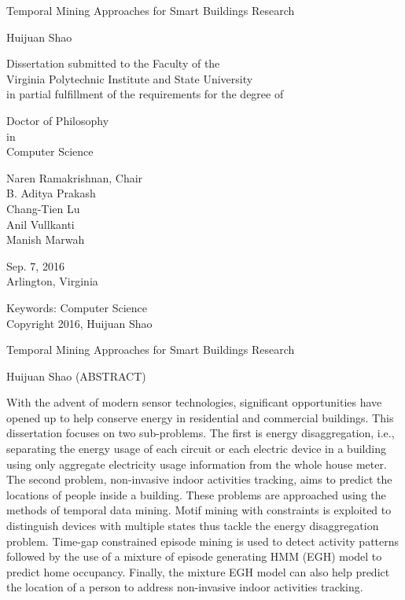 \documentclass[12pt,pdf]{report}
\begin{document}
\thispagestyle{empty}
\begin{center}

{\Large 
Temporal Mining Approaches for Smart Buildings Research
}

\vfill

Huijuan Shao

\vfill

Dissertation submitted to the Faculty of the \\
Virginia Polytechnic Institute and State University \\
in partial fulfillment of the requirements for the degree of

\vfill

Doctor of Philosophy \\
in \\
Computer Science

\vfill

Naren Ramakrishnan, Chair \\
B. Aditya Prakash \\
Chang-Tien Lu \\
Anil Vullkanti \\
Manish Marwah

\vfill

Sep. 7, 2016 \\
Arlington, Virginia

\vfill

Keywords: Computer Science
\\
Copyright 2016, Huijuan Shao

\end{center}

\pagebreak

\thispagestyle{empty}
\begin{center}

{\large Temporal Mining Approaches for Smart Buildings Research }

\vfill
Huijuan Shao
\vfill
(ABSTRACT)
\vfill
\end{center}
With the advent of modern sensor technologies, 
significant opportunities have opened up to help conserve energy in 
residential and commercial buildings. 
This dissertation focuses on two sub-problems. 
The first is energy disaggregation, i.e., 
separating the energy usage 
of each circuit or each electric device in a building 
using only aggregate electricity usage information from 
the whole house meter. 
The second problem, non-invasive indoor activities tracking, aims to 
predict the locations of people inside a building. 
These problems are approached using the methods of 
temporal data mining. 
Motif mining with constraints is exploited to distinguish devices with multiple states 
thus tackle the energy disaggregation problem.
Time-gap constrained episode mining is used to detect 
activity patterns followed by the use of a mixture of episode generating HMM (EGH) model 
to predict home occupancy.  
Finally, the mixture EGH
model can also help predict the location of a person to 
address non-invasive indoor activities tracking. 
\end{document}
